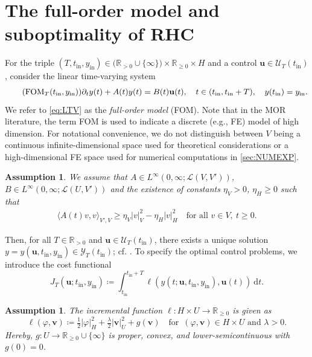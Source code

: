 \documentclass{m2an}
\def\R{\mathbb{R}}
\newcommand{\ddt}{\partial_t}
\newcommand{\bu}{\mathbf{u}}
\newcommand{\bv}{\mathbf{v}}
\newcommand{\dt}{\mathrm{d}t}
\newcommand{\tint}{t_{\mathrm{in}}}
\newcommand{\yint}{y_{\mathrm{in}}}
\newcommand{\mU}{{\mathscr U}}
\newcommand{\mY}{{\mathscr Y}}
\newcommand{\norm}[2]{\left|#1\right|_{#2}}
\newcommand{\scalprod}[3]{\langle#1, #2\rangle_{#3}}
\newtheorem{assumption}[thrm]{Assumption}
\begin{document}
\section{The full-order model and suboptimality of RHC}\label{sec:FOM_stability_RHC}
%
For the triple $(T,\tint,\yint)\in {({\R_{>0}\cup \{ \infty \})}}\times\R_{\ge0} \times H$ and a control $\bu\in \mU_T(\tint)$, consider the linear time-varying system
%
\begin{align}
    \label{eq:LTV}
    \tag{$\mathrm{FOM}_T(\tint,\yint)$}
    \ddt y(t)+A(t)y(t)=B(t)\bu(t), \quad t \in  ( \tint,\tint+T),\quad y(\tint)=\yint.
\end{align}
%
We refer to \eqref{eq:LTV} as the \emph{full-order model} (FOM). {Note that in the MOR literature, the term FOM is used to indicate a discrete (e.g., FE) model of high dimension. For notational convenience, we do not distinguish between $V$ being a continuous infinite-dimensional space used for theoretical considerations or a high-dimensional FE space used for numerical computations in \cref{sec:NUMEXP}.}
%
\begin{assumption}\label{ass:pde}
    We assume that $A\in L^\infty(0,\infty;\mathcal{L}(V,V'))$, $B \in  L^\infty(0,\infty;\mathcal{L}(U,V'))$
     and the existence of constants $\eta_V>0$, $\eta_H\geq 0$ such that
    \begin{align}\label{eq:weak_coercivity}
        \scalprod{A(t)v}{v}{V',V} \geq \eta_V\norm{v}{V}^2 - \eta_H\norm{v}{H}^2 \quad \text{for all } v\in V,\  t\geq 0.
    \end{align}
\end{assumption}
%
Then, for all $T\in\R_{>0}$ and $\bu\in \mU_T(\tint)$, there exists a unique solution $y=y(\bu,\tint,\yint)\in\mY_T(\tint)$; cf. \cite{LioM72}. To specify the optimal control problems, we introduce the cost functional
%
\begin{equation}\label{eq:cost}\nonumber
    J_T(\bu;\tint,\yint)\coloneqq\int^{\tint+T}_{\tint} \ell(y(t;\bu,\tint,\yint),\bu(t))\ \dt.
\end{equation}
%
\begin{assumption}\label{ass:running_cost}
%
The incremental function $\ell: H\times U \to \R_{\geq 0}$ is given as
%
\begin{equation}
\label{eq:ell_property}
\ell(\varphi,\bv)\coloneqq\tfrac{1}{2}\norm{ \varphi}{H}^2+\tfrac{\lambda}{2}\norm{\bv}{U}^2+g(\bv)\quad\text{for }\,(\varphi,\bv)\in H \times U\text{ and }\lambda>0.
\end{equation}
Hereby, $g:U \to \R_{\geq 0}\cup \{\infty\}$ is proper, convex, and lower-semicontinuous with $g(0)=0$.
\end{assumption}
\end{document}
